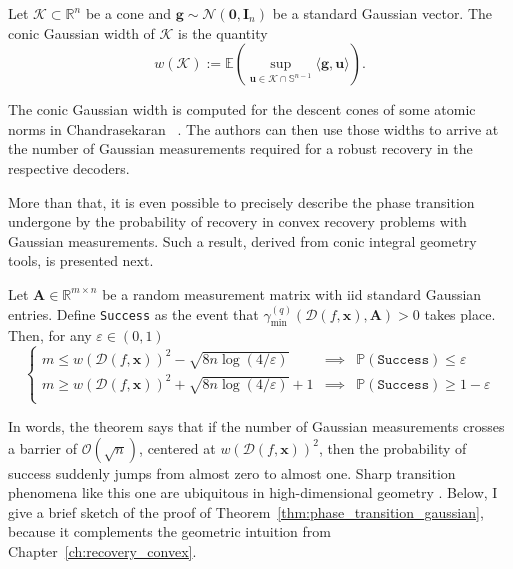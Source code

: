 \begin{definition}
    Let $\mathcal{K} \subset \mathbb{R}^{n}$ be a cone and $\mathbf{g} \sim \mathcal{N}(\mathbf{0}, \mathbf{I}_n)$ be a standard Gaussian vector. The conic Gaussian width of $\mathcal{K}$ is the quantity
    \begin{equation}
        w(\mathcal{K}) := \mathbb{E} \left ( \underset{\mathbf{u} \in \mathcal{K} \cap \mathbb{S}^{n-1}}{\sup} \langle \mathbf{g}, \mathbf{u}\rangle \right ).
    \end{equation}
\end{definition}

The conic Gaussian width is computed for the descent cones of some atomic norms in Chandrasekaran \etal~\cite{chandrasekaran2012}. The authors can then use those widths to arrive at the number of Gaussian measurements required for a robust recovery in the respective decoders.

More than that, it is even possible to precisely describe the phase transition undergone by the probability of recovery in convex recovery problems with Gaussian measurements. Such a result, derived from conic integral geometry tools, is presented next.

\begin{theorem}
    \label{thm:phase_transition_gaussian}
    Let $\mathbf{A} \in \mathbb{R}^{m \times n}$ be a random measurement matrix with \acrshort{iid} standard Gaussian entries. Define \texttt{Success} as the event that $\gamma_{\min}^{(q)} \left ( \mathcal{D}( f, \mathbf{x}), \mathbf{A} \right ) > 0$ takes place. Then, for any $\varepsilon \in (0, 1)$
    \begin{equation}
        \left \{
        \begin{matrix}
        m \leq w(\mathcal{D}(f, \mathbf{x}))^2 - \sqrt{8 n \log (4 / \varepsilon)} & \implies & \mathbb{P} \left ( \texttt{Success} \right ) \leq \varepsilon \\
        m \geq w(\mathcal{D}(f, \mathbf{x}))^2 + \sqrt{8 n \log (4/\varepsilon)} + 1 & \implies & \mathbb{P} \left ( \texttt{Success} \right ) \geq 1 - \varepsilon \\
        \end{matrix}
        \right.
    \end{equation}
\end{theorem}

In words, the theorem says that if the number of Gaussian measurements crosses a barrier of $\mathcal{O} \left( \sqrt{n} \right)$, centered at $w(\mathcal{D}(f, \mathbf{x}))^2$, then the probability of success suddenly jumps from almost zero to almost one. Sharp transition phenomena like this one are ubiquitous in high-dimensional geometry \cite{donoho2009a,oymak2018}. Below, I give a brief sketch of the proof of Theorem~\ref{thm:phase_transition_gaussian}, because it complements the geometric intuition from Chapter~\ref{ch:recovery_convex}.

